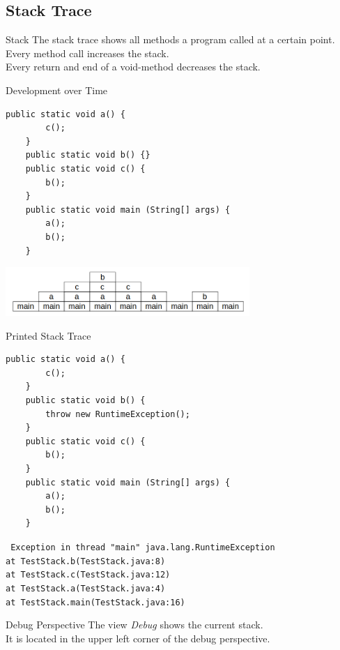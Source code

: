 \subsection{Stack Trace}
\begin{frame}[fragile]{Stack}
	The stack trace shows all methods a program called at a certain point.
	\vfill
	Every method call increases the stack. \\
	Every return and end of a void-method decreases the stack.
\end{frame}

\begin{frame}[fragile]{Development over Time}
	\begin{lstlisting}[basicstyle=\ttfamily\scriptsize, firstnumber = 1]
	public static void a() {
	    c();
	}
	public static void b() {}
	public static void c() {
	    b();
	}
	public static void main (String[] args) {
	    a();
	    b();
	}
	\end{lstlisting}
	\includegraphics[width=25em]{res/debug_stack.png} \\
\end{frame}

\begin{frame}[fragile]{Printed Stack Trace}
	\begin{lstlisting}[basicstyle=\ttfamily\scriptsize, firstnumber = 3]
	public static void a() {
	    c();
	}
	public static void b() {
	    throw new RuntimeException();
	}
	public static void c() {
	    b();
	}
	public static void main (String[] args) {
	    a();
	    b();
	}
	\end{lstlisting}
	\footnotesize\texttt{	
	Exception in thread "main" java.lang.RuntimeException\\
	at TestStack.b(TestStack.java:8)\\
	at TestStack.c(TestStack.java:12)\\
	at TestStack.a(TestStack.java:4)\\
	at TestStack.main(TestStack.java:16)}
\end{frame}

\begin{frame}{Debug Perspective}
	The view \emph{Debug} shows the current stack. \\
	It is located in the upper left corner of the debug perspective.
\end{frame}

